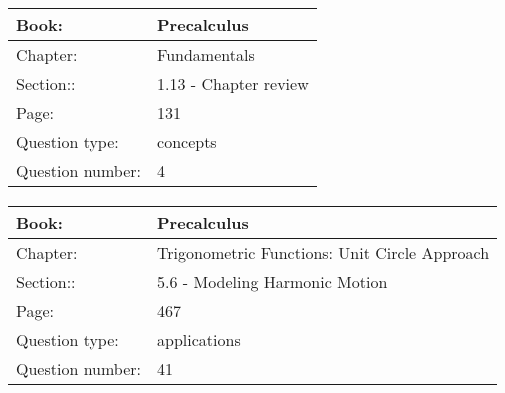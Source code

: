 \documentclass{article}
\begin{document}
            \paragraph{}
            \begin{tabularx}{1\textwidth}{
                    p{}
                    p{}
                }
                \toprule
                Book: & Precalculus
                \\
                \midrule
                Chapter: & Fundamentals
                \\
                \midrule
                Section:: & 1.13 - Chapter review
                \\
                \midrule
                Page: & 131
                \\
                \midrule
                Question type: & concepts
                \\
                \midrule
                Question number: & 4
                \\
                \bottomrule
            \end{tabularx}
            
            \paragraph{}
            \begin{tabularx}{1\textwidth}{
                    p{}
                    p{}
                }
                \toprule
                Book: & Precalculus
                \\
                \midrule
                Chapter: & Trigonometric Functions: Unit Circle Approach
                \\
                \midrule
                Section:: & 5.6 - Modeling Harmonic Motion
                \\
                \midrule
                Page: & 467
                \\
                \midrule
                Question type: & applications
                \\
                \midrule
                Question number: & 41
                \\
                \bottomrule
            \end{tabularx}
            
        
\end{document}
